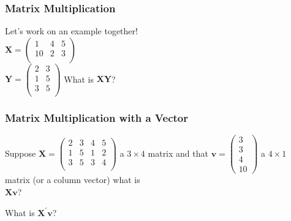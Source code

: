 \documentclass{beamer}
\numberwithin{equation}{section}
\begin{document}
\begin{frame}
\frametitle{Matrix Multiplication}

Let's work on an example together!\\
$\boldsymbol{X} = \begin{pmatrix} 1 & 4 & 5 \\
													10 & 2 & 3 \\
							\end{pmatrix} 						$													\\
$\boldsymbol{Y} = \begin{pmatrix} 2 & 3 \\
													1 & 5 \\
													3 & 5\\
							\end{pmatrix} 				$
What is $\boldsymbol{X} \boldsymbol{Y} $?


\pause 





\end{frame}


\begin{frame}
\frametitle{Matrix Multiplication with a Vector} 

Suppose $\boldsymbol{X} = \begin{pmatrix} 2 & 3 & 4 & 5 \\
													1 & 5 & 1 & 2\\
													3 & 5 & 3 & 4 \\
							\end{pmatrix} 	$ a $3 \times 4$ matrix and that $\boldsymbol{v}  = \begin{pmatrix} 3\\ 3 \\ 4 \\ 10 \end{pmatrix} $ a $4 \times 1$ matrix (or a \alert{column} vector) what is \\
$\boldsymbol{X} \boldsymbol{v}$?


What is $\boldsymbol{X}^{'} \boldsymbol{v}$?




\end{frame}
\end{document}
